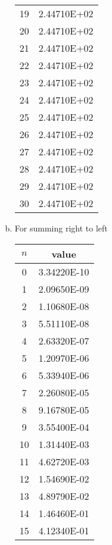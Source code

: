 \begin{enumerate}[(a)]
\begin{table}[H]
\begin{tabular}{c|c}
					19 & 2.44710E+02 \\
					20 & 2.44710E+02 \\
					21 & 2.44710E+02 \\
					22 & 2.44710E+02 \\
					23 & 2.44710E+02 \\
					24 & 2.44710E+02 \\
					25 & 2.44710E+02 \\
					26 & 2.44710E+02 \\
					27 & 2.44710E+02 \\
					28 & 2.44710E+02 \\
					29 & 2.44710E+02 \\
					30 & 2.44710E+02 \\
				\end{tabular}
			\end{table}
	\item For summing right to left
			\begin{table}[H]
			\centering
				\begin{tabular}{c|c}
					$n$ & value \\
					\hline
					0 & 3.34220E-10 \\
					1 & 2.09650E-09 \\
					2 & 1.10680E-08 \\
					3 & 5.51110E-08 \\
					4 & 2.63320E-07 \\
					5 & 1.20970E-06 \\
					6 & 5.33940E-06 \\
					7 & 2.26080E-05 \\
					8 & 9.16780E-05 \\
					9 & 3.55400E-04 \\
					10 & 1.31440E-03 \\
					11 & 4.62720E-03 \\
					12 & 1.54690E-02 \\
					13 & 4.89790E-02 \\
					14 & 1.46460E-01 \\
					15 & 4.12340E-01 \\

\end{tabular}
\end{table}
\end{enumerate}
